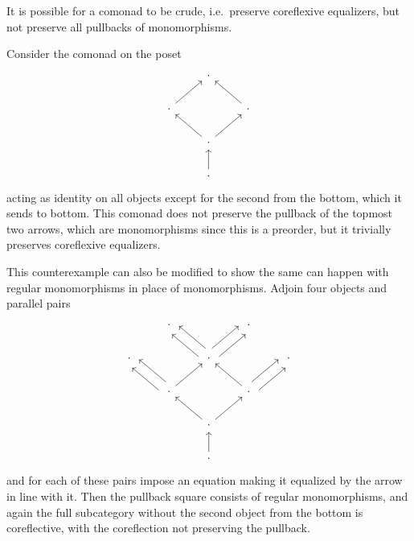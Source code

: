 \documentclass[11pt, oneside, article]{memoir}
\theoremstyle{plain}
\theoremstyle{definition}
\theoremstyle{remark}
\newenvironment{counterexample}
{\renewcommand\qedsymbol{$\lrcorner$}%
  \pushQED{\qed}\mycounterexample}
{\popQED\endmycounterexample}
\begin{document}

It is possible for a comonad to be crude, i.e.\ preserve coreflexive
equalizers, but not preserve all pullbacks of monomorphisms.

\begin{counterexample}[Non-preserved intersection]
  Consider the comonad on the poset
  \[\begin{tikzcd}
      & \cdot & \\
      \cdot && \cdot \\
      & \cdot \\
      & \cdot
      \arrow[from=2-1, to=1-2]
      \arrow[from=2-3, to=1-2]
      \arrow[from=3-2, to=2-1]
      \arrow[from=3-2, to=2-3]
      \arrow[from=4-2, to=3-2]
    \end{tikzcd}
  \]
  acting as identity on all objects except for the second from the
  bottom, which it sends to bottom. This comonad does not preserve the
  pullback of the topmost two arrows, which are monomorphisms since
  this is a preorder, but it trivially preserves coreflexive
  equalizers.

  This counterexample can also be modified to show the same can happen
  with regular monomorphisms in place of monomorphisms. Adjoin four
  objects and parallel pairs
  \[\begin{tikzcd}
      & \cdot && \cdot & \\
      \cdot && \cdot && \cdot \\
      & \cdot && \cdot \\
      && \cdot \\
      && \cdot
      \arrow[shift right=2, from=2-3, to=1-2]
      \arrow[shift left=2, from=2-3, to=1-2]
      \arrow[shift right=2, from=2-3, to=1-4]
      \arrow[shift left=2, from=2-3, to=1-4]
      \arrow[shift right=2, from=3-2, to=2-1]
      \arrow[shift left=2, from=3-2, to=2-1]
      \arrow[from=3-2, to=2-3]
      \arrow[from=3-4, to=2-3]
      \arrow[shift right=2, from=3-4, to=2-5]
      \arrow[shift left=2, from=3-4, to=2-5]
      \arrow[from=4-3, to=3-2]
      \arrow[from=4-3, to=3-4]
      \arrow[from=5-3, to=4-3]
    \end{tikzcd}
  \]
  and for each of these pairs impose an equation making it equalized by the
  arrow in line with it. Then the pullback square consists of regular
  monomorphisms, and again the full subcategory without the second
  object from the bottom is coreflective, with the coreflection not
  preserving the pullback.
\end{counterexample}
\end{document}
